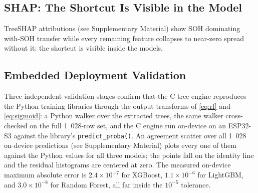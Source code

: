 \documentclass[preprint,12pt]{elsarticle}
\begin{document}
\begin{table}[!t]
\caption{Operational Evaluation at H=20 (XGBoost, ALL-LCO Source): Decision Threshold Selected on Source Out-of-Fold Scores With a 10\% False-Alarm Budget, Then Applied Unchanged to the Target. Reported Are the Target Miss Rate (FNR) and Target False-Alarm Rate (FPR).}
\label{tab:oper}
\centering
{}
\end{table}



\subsection{SHAP: The Shortcut Is Visible in the Model}
TreeSHAP attributions (see Supplementary Material) show SOH dominating with-SOH transfer while every remaining feature collapses to near-zero spread without it: the shortcut is visible inside the models.
\subsection{Embedded Deployment Validation}
Three independent validation stages confirm that the C tree engine reproduces the Python training libraries through the output transforms of \eqref{eq:rf} and \eqref{eq:sigmoid}: a Python walker over the extracted trees, the same walker cross-checked on the full 1~028-row set, and the C engine run on-device on an ESP32-S3 against the library's \texttt{predict\_proba()}. An agreement scatter over all 1~028 on-device predictions (see Supplementary Material) plots every one of them against the Python values for all three models; the points fall on the identity line and the residual histograms are centered at zero. The measured on-device maximum absolute error is $2.4\times10^{-7}$ for XGBoost, $1.1\times10^{-6}$ for LightGBM, and $3.0\times10^{-8}$ for Random Forest, all far inside the $10^{-5}$ tolerance.
\end{document}
